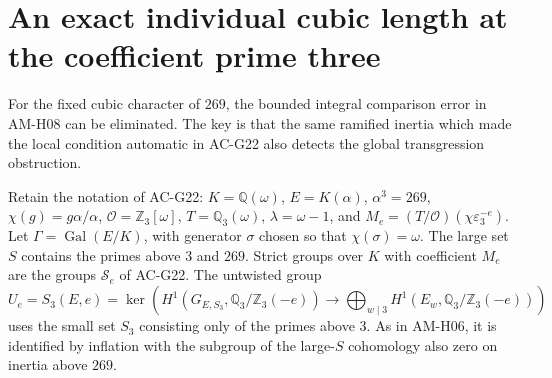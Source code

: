 \section{An exact individual cubic length at the coefficient prime three}
\label{sec:exact-cubic-descent}

For the fixed cubic character of $269$, the bounded integral
comparison error in AM-H08 can be eliminated.  The key is that the
same ramified inertia which made the local condition automatic in
AC-G22 also detects the global transgression obstruction.

Retain the notation of AC-G22: $K=\mathbb Q(\omega)$,
$E=K(\alpha)$, $\alpha^3=269$, $\chi(g)=g\alpha/\alpha$,
$\mathcal O=\mathbb Z_3[\omega]$, $T=\mathbb Q_3(\omega)$,
$\lambda=\omega-1$, and
$M_e=(T/\mathcal O)(\chi\varepsilon_3^{-e})$.
Let $\Gamma=\operatorname{Gal}(E/K)$, with generator $\sigma$
chosen so that $\chi(\sigma)=\omega$.
The large set $S$ contains the primes above $3$ and $269$.
Strict groups over $K$ with coefficient $M_e$ are the groups
$\mathcal S_e$ of AC-G22.  The untwisted group
\[
 U_e=S_3(E,e)
 =\ker\left(H^1(G_{E,S_3},\mathbb Q_3/\mathbb Z_3(-e))
       \longrightarrow\bigoplus_{w\mid3}
            H^1(E_w,\mathbb Q_3/\mathbb Z_3(-e))\right)
\]
uses the small set $S_3$ consisting only of the primes above $3$.
As in AM-H06, it is identified by inflation with the subgroup
of the large-$S$ cohomology also zero on inertia above $269$.

